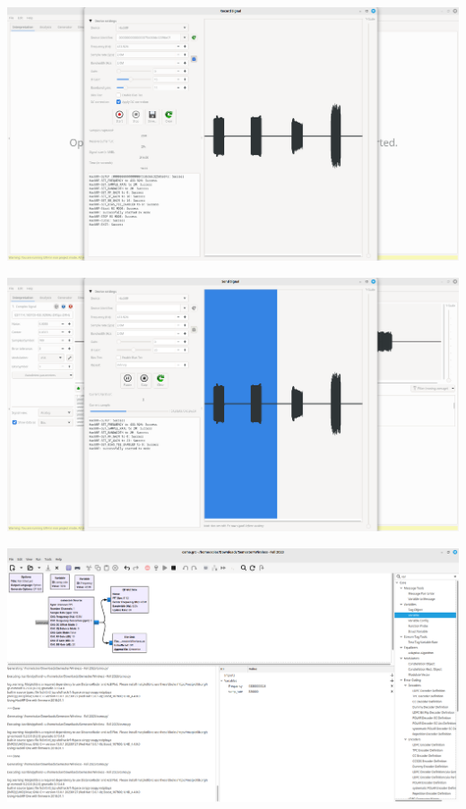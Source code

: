 \documentclass{beamer}
\begin{document}
\begin{frame}
\includegraphics[width=\textwidth]{../Pics/screenshots/URH_Creating_Signal.png}
\end{frame}

\begin{frame}
\includegraphics[width=\textwidth]{../Pics/screenshots/URH_Playing_Signal.png}
\end{frame}

\begin{frame}
\includegraphics[width=\textwidth]{../Pics/screenshots/gnu_radio.png}
\end{frame}
\end{document}
